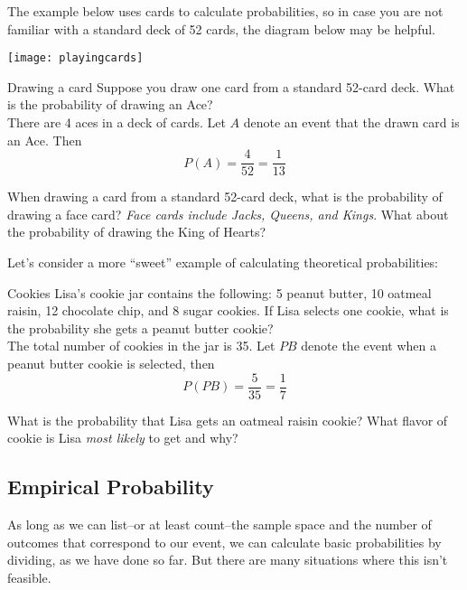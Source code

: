 The example below uses cards to calculate probabilities, so in case you are not familiar with a standard deck of 52 cards, the diagram below may be helpful. 

\begin{center}
\texttt{[image: playingcards]}
\end{center}
\begin{example}[https://www.youtube.com/watch?v=h_RyIlkgV2M]{Drawing a card}
Suppose you draw one card from a standard 52-card deck. What is the probability of drawing an Ace?   \\

 There are 4 aces in a deck of cards. Let $A$ denote an event that the drawn card is an Ace. Then
\[  P(A) = \frac{4}{52}  = \frac{1}{13} \]
\end{example}

\begin{try}
When drawing a card from a standard 52-card deck, what is the probability of drawing a face card? \emph{Face cards include Jacks, Queens, and Kings}. What about the probability of drawing the King of Hearts?
\end{try}

\noindent Let's consider a more ``sweet'' example of calculating theoretical probabilities:
\begin{example}[https://www.youtube.com/watch?v=7DSjUMJHnTk]{Cookies}
Lisa's cookie jar contains the following: 5 peanut butter, 10 oatmeal raisin, 12 chocolate chip, and 8 sugar cookies. If Lisa selects one cookie, what is the probability she gets a peanut butter cookie? \\

 The total number of cookies in the jar is 35. Let $PB$ denote the event when a peanut butter cookie is selected, then
\[  P(PB) = \frac{5}{35} = \frac{1}{7} \]
\end{example}

\begin{try}
What is the probability that Lisa gets an oatmeal raisin cookie? What flavor of cookie is Lisa \emph{most likely} to get and why? 
\end{try} 
\vfill
\pagebreak

\subsection{Empirical Probability}
As long as we can list--or at least count--the sample space and the number of outcomes that correspond to our event, we can calculate basic probabilities by dividing, as we have done so far.  But there are many situations where this isn't feasible.  

